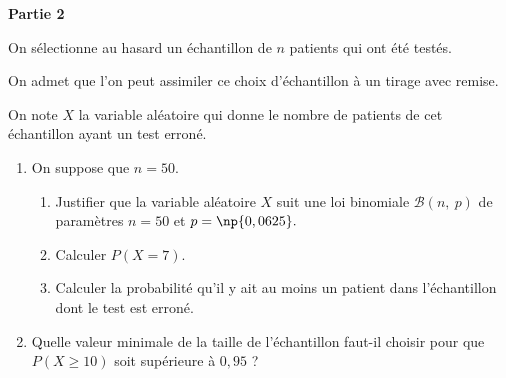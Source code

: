 \bigskip

\textbf{Partie 2}

\medskip

On sélectionne au hasard un échantillon de $n$ patients qui ont été testés.

On admet que l'on peut assimiler ce choix d'échantillon à un tirage avec remise.

On note $X$ la variable aléatoire qui donne le nombre de patients de cet échantillon ayant un test erroné.

\medskip

\begin{enumerate}
\item On suppose que $n = 50$.
	\begin{enumerate}
		\item Justifier que la variable aléatoire $X$ suit une loi binomiale $\mathcal{B}(n,\: p)$ de paramètres
$n = 50$ et $p = \np{0,0625}.$
		\item Calculer $P(X = 7)$.
		\item Calculer la probabilité qu'il y ait au moins un patient dans l'échantillon dont le test est erroné.
	\end{enumerate}	
\item Quelle valeur minimale de la taille de l'échantillon faut-il choisir pour que $P(X \geqslant 10)$ soit supérieure à $0,95$ ?
\end{enumerate}

\bigskip
